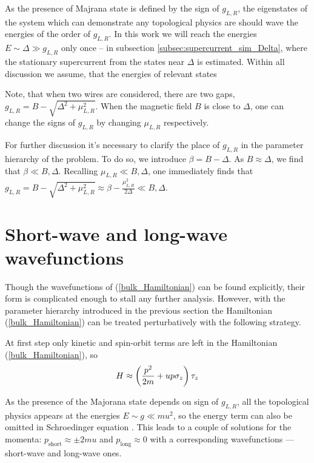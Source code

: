 As the presence of Majrana state is defined by the sign of $ g_{L,R} $,  the eigenstates of the system which can demonstrate any topological physics are should wave the energies of the order of $ g_{L,R} $. In this work we will reach the energies $ E\sim	\Delta \gg g_{L,R} $ only once -- in subsection \ref{subsec:supercurrent_sim_Delta}, where the stationary supercurrent from the states near $ \Delta $ is estimated. Within all discussion we assume, that the energies of relevant states 
\fi

Note, that when two wires are considered, there are two gaps, $ g_{L,R} = B-\sqrt{\Delta^2+\mu_{L,R}^2} $. When the magnetic field $ B $ is close to $ \Delta $, one can change the signs of $ g_{L,R} $ by changing $ \mu_{L,R} $ respectively. 

For further discussion it's necessary to clarify the place of $ g_{L,R} $ in the parameter hierarchy of the problem. To do so, we introduce $ \beta=B-\Delta $. As $ B \approx \Delta $, we find that $ \beta\ll B,\Delta $. Recalling $ \mu_{L,R}\ll B, \Delta $, one immediately finds that $ g_{L,R}=B-\sqrt{\Delta^2+\mu_{L,R}^2}\approx\beta -\frac{\mu_{L,R}^2}{2\Delta	} \ll B,\Delta$.


\section{Short-wave and long-wave wavefunctions}
\label{sec:high_and_low_modes}

Though the wavefunctions of (\ref{bulk_Hamiltonian}) can be found explicitly, their form is  complicated enough to stall any further analysis. However, with the parameter hierarchy introduced in the previous section the Hamiltonian (\ref{bulk_Hamiltonian}) can be treated perturbatively with the following strategy.

At first step only kinetic and spin-orbit terms are left in the Hamiltonian (\ref{bulk_Hamiltonian}), so 
\begin{gather}
\label{short-long_hamiltonian}
H\approx\left(\frac{p^2}{2m}+up\sigma_z\right)\tau_z
\end{gather}

  As the presence of the Majorana state depends on sign of $ g_{L,R} $, all the topological physics appears at the energies $ E\sim g \ll mu^2$, so  the energy term can also  be omitted in Schroedinger equation . This leads to a couple of solutions for the momenta: $ p_{\mathrm{short}}\approx\pm2mu $ and $ p_{\mathrm{long}}\approx0 $ with a corresponding wavefunctions --- short-wave and long-wave ones.
  
